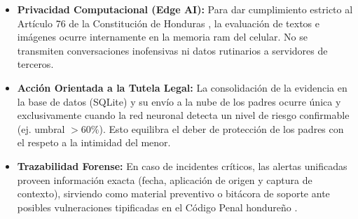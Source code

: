 \begin{itemize}
    \item \textbf{Privacidad Computacional (Edge AI):} Para dar cumplimiento estricto al Artículo 76 de la Constitución de Honduras \cite{constitucion_honduras}, la evaluación de textos e imágenes ocurre internamente en la memoria \gls{ram} del celular. No se transmiten conversaciones inofensivas ni datos rutinarios a servidores de terceros.
    \item \textbf{Acción Orientada a la Tutela Legal:} La consolidación de la evidencia en la base de datos (SQLite) y su envío a la nube de los padres ocurre única y exclusivamente cuando la red neuronal detecta un nivel de riesgo confirmable (ej. umbral $>60\%$). Esto equilibra el deber de protección de los padres con el respeto a la intimidad del menor.
    \item \textbf{Trazabilidad Forense:} En caso de incidentes críticos, las alertas unificadas proveen información exacta (fecha, aplicación de origen y captura de contexto), sirviendo como material preventivo o bitácora de soporte ante posibles vulneraciones tipificadas en el Código Penal hondureño \cite{cdm_ciberviolencia_2022}.
\end{itemize}